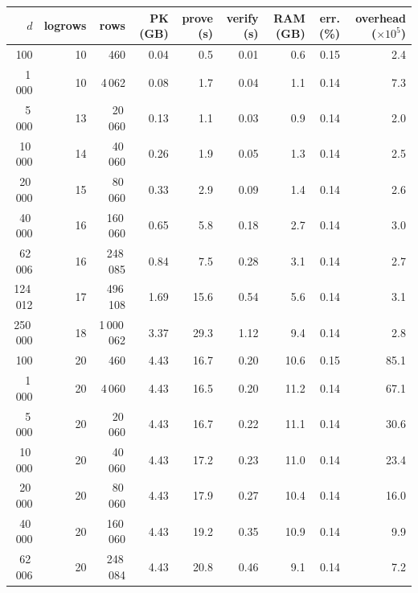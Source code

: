 \begin{tabular}{rrrrrrrrr}
\toprule
$d$ & logrows & rows & PK (GB) & prove (s) & verify (s) & RAM (GB) & err. (\%) & overhead ($\times10^{5}$) \\
\midrule
100 & 10 & 460 & 0.04 & 0.5 & 0.01 & 0.6 & 0.15 & 2.4 \\
1\,000 & 10 & 4\,062 & 0.08 & 1.7 & 0.04 & 1.1 & 0.14 & 7.3 \\
5\,000 & 13 & 20\,060 & 0.13 & 1.1 & 0.03 & 0.9 & 0.14 & 2.0 \\
10\,000 & 14 & 40\,060 & 0.26 & 1.9 & 0.05 & 1.3 & 0.14 & 2.5 \\
20\,000 & 15 & 80\,060 & 0.33 & 2.9 & 0.09 & 1.4 & 0.14 & 2.6 \\
40\,000 & 16 & 160\,060 & 0.65 & 5.8 & 0.18 & 2.7 & 0.14 & 3.0 \\
62\,006 & 16 & 248\,085 & 0.84 & 7.5 & 0.28 & 3.1 & 0.14 & 2.7 \\
124\,012 & 17 & 496\,108 & 1.69 & 15.6 & 0.54 & 5.6 & 0.14 & 3.1 \\
250\,000 & 18 & 1\,000\,062 & 3.37 & 29.3 & 1.12 & 9.4 & 0.14 & 2.8 \\
\midrule
100 & 20 & 460 & 4.43 & 16.7 & 0.20 & 10.6 & 0.15 & 85.1 \\
1\,000 & 20 & 4\,060 & 4.43 & 16.5 & 0.20 & 11.2 & 0.14 & 67.1 \\
5\,000 & 20 & 20\,060 & 4.43 & 16.7 & 0.22 & 11.1 & 0.14 & 30.6 \\
10\,000 & 20 & 40\,060 & 4.43 & 17.2 & 0.23 & 11.0 & 0.14 & 23.4 \\
20\,000 & 20 & 80\,060 & 4.43 & 17.9 & 0.27 & 10.4 & 0.14 & 16.0 \\
40\,000 & 20 & 160\,060 & 4.43 & 19.2 & 0.35 & 10.9 & 0.14 & 9.9 \\
62\,006 & 20 & 248\,084 & 4.43 & 20.8 & 0.46 & 9.1 & 0.14 & 7.2 \\
\bottomrule
\end{tabular}
